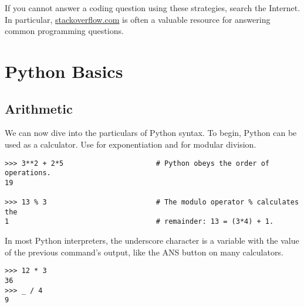 If you cannot answer a coding question using these strategies, search the Internet.
In particular, \href{http://stackoverflow.com/}{stackoverflow.com} is often a valuable resource for answering common programming questions.

\begin{comment} %
The Anaconda distribution also includes three additional interfaces: Notebook, QTConsole, and Spyder.
IPython Notebook (also know as Jupyter) is displayed in a web browser and has many features that are particularly useful for presentations and for running separated blocks of code.
The QTConsole is a console that communicates with Jupyter more fluidly than the regular IPython console.
Spyder is a popular IDE built specifically for Python programming.
To start IPython Notebook, QTConsole, or Spyder from the terminal, run \li{ipython notebook}, \li{ipython qtconsole}, or \li{spyder}, respectively.
\end{comment}

\section*{Python Basics} %

\subsection*{Arithmetic} %

We can now dive into the particulars of Python syntax.
To begin, Python can be used as a calculator.
Use \li{**} for exponentiation and \li{\%} for modular division.

\begin{lstlisting}
>>> 3**2 + 2*5                      # Python obeys the order of operations.
19

>>> 13 % 3                          # The modulo operator % calculates the
1                                   # remainder: 13 = (3*4) + 1. 
\end{lstlisting}

In most Python interpreters, the underscore character \li{\_} is a variable with the value of the previous command's output, like the ANS button on many calculators.

\begin{lstlisting}
>>> 12 * 3
36
>>> _ / 4
9
\end{lstlisting}

